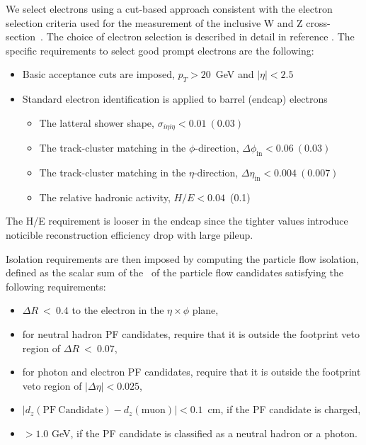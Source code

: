 We select electrons using a cut-based approach consistent with the electron 
selection criteria used for the measurement of the inclusive W and Z 
cross-section~\cite{VBTFCrossSectionNote}. 
The choice of electron selection is described in detail in reference \cite{HWW2011AN}.
The specific requirements to select good prompt electrons are the following:

\begin{itemize}
    \item Basic acceptance cuts are imposed,  $p_T>20$~GeV and $|\eta| < 2.5$
    \item Standard electron identification is applied to barrel (endcap) electrons
    \begin{itemize}
        \item The latteral shower shape, $\sigma_{i\eta i\eta} < 0.01~(0.03)$
        \item The track-cluster matching in the $\phi$-direction, $\Delta \phi_{\mathrm{in}} < 0.06~(0.03)$
        \item The track-cluster matching in the $\eta$-direction, $\Delta \eta_{\mathrm{in}} < 0.004~(0.007)$
        \item The relative hadronic activity, $H/E<0.04$~(0.1) 
    \end{itemize}
\end{itemize}

The H/E requirement is looser in the endcap since the tighter values
introduce noticible reconstruction efficiency drop with large pileup.

Isolation requirements are then imposed by computing the particle flow isolation,
defined as the scalar sum of the \pt\ of the particle flow candidates satisfying 
the following requirements:

\begin{itemize}
\item $\Delta R~<~0.4$ to the electron in the $\eta \times \phi$ plane,
\item for neutral hadron PF candidates, require that it is outside the footprint veto region of $\Delta R~<~0.07$,
\item for photon and electron PF candidates, require that it is outside the footprint veto region of $|\Delta\eta|<0.025$,
\item $|d_{z}(\mathrm{PF~Candidate}) - d_{z}(\mathrm{muon})| < 0.1$~cm, if the PF candidate is charged,
\item \pt $>1.0$ GeV, if the PF candidate is classified as a neutral hadron or a photon.
\end{itemize}

